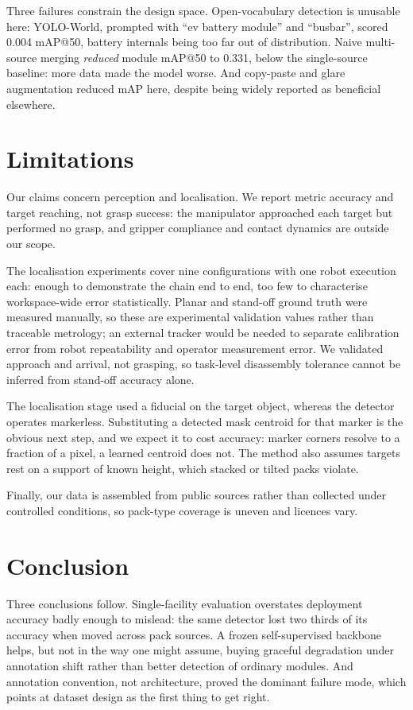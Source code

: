 \documentclass[conference]{IEEEtran}
\begin{document}
Three failures constrain the design space. Open-vocabulary detection is unusable
here: YOLO-World, prompted with ``ev battery module'' and ``busbar'', scored 0.004
mAP@50, battery internals being too far out of distribution. Naive multi-source
merging \emph{reduced} module mAP@50 to 0.331, below the single-source baseline: more
data made the model worse. And copy-paste and glare augmentation reduced mAP here,
despite being widely reported as beneficial elsewhere.

\section{Limitations}

Our claims concern perception and localisation. We report metric accuracy and target
reaching, not grasp success: the manipulator approached each target but performed no
grasp, and gripper compliance and contact dynamics are outside our scope.

The localisation experiments cover nine configurations with one robot execution each:
enough to demonstrate the chain end to end, too few to characterise workspace-wide
error statistically. Planar and stand-off ground truth were measured manually, so
these are experimental validation values rather than traceable metrology; an external
tracker would be needed to separate calibration error from robot repeatability and
operator measurement error. We validated approach and arrival, not grasping, so
task-level disassembly tolerance cannot be inferred from stand-off accuracy alone.

The localisation stage used a fiducial on the target object, whereas the detector
operates markerless. Substituting a detected mask centroid for that marker is the
obvious next step, and we expect it to cost accuracy: marker corners resolve to a
fraction of a pixel, a learned centroid does not. The method also assumes targets rest
on a support of known height, which stacked or tilted packs violate.

Finally, our data is assembled from public sources rather than collected under
controlled conditions, so pack-type coverage is uneven and licences vary.

\section{Conclusion}

Three conclusions follow. Single-facility evaluation overstates deployment accuracy
badly enough to mislead: the same detector lost two thirds of its accuracy when moved
across pack sources. A frozen self-supervised backbone helps, but not in the way one
might assume, buying graceful degradation under annotation shift rather than better
detection of ordinary modules. And annotation convention, not architecture, proved
the dominant failure mode, which points at dataset design as the first thing to get
right.
\end{document}
